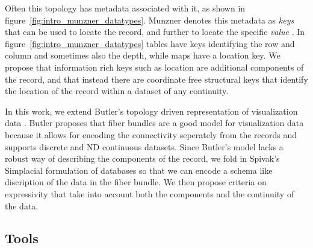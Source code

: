 \documentclass[../main.tex]{subfiles}
\begin{document}
Often this topology has metadata associated with it, as shown in figure~\ref{fig:intro_munzner_datatypes}. Munzner denotes this metadata as \textit{keys} that can be used to locate the record, and further to locate the specific \textit{value} \cite{munznerChDataAbstraction}. In figure~\ref{fig:intro_munzner_datatypes} tables have keys identifying the row and column and sometimes also the depth, while maps have a location key. We propose that information rich keys such as location are additional components of the record, and that instead there are coordinate free structural keys that identify the location of the record within a dataset of any continuity. 

In this work, we extend Butler's topology driven representation of visualization data \cite{butlerVisualizationModelBased1989,butlerVectorBundleClassesForm1992}. Butler proposes that fiber bundles are a good model for visualization data because it allows for encoding the connectivity seperately from the records and supports discrete and ND continuous datasets. Since Butler's model lacks a robust way of describing the components of the record, we fold in Spivak's Simplacial formulation of databases \cite{spivakDatabasesAreCategories2010,spivakSIMPLICIALDATABASES} so that we can encode a schema like discription of the data in the fiber bundle. We then propose criteria on expressivity that take into account both the components and the continuity of the data. 

\subsection{Tools}
\label{sec:intro_data_tools}
 
\end{document}

